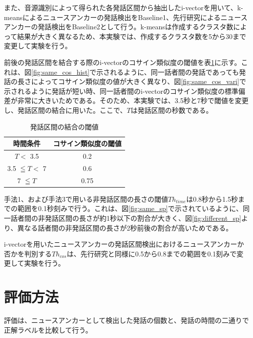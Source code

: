 また、音源識別によって得られた各発話区間から抽出したi-vectorを用いて、k-meansによるニュースアンカーの発話検出をBaseline1、先行研究\cite{nozaki_gakuseikai}によるニュースアンカーの発話検出をBaseline2として行う。k-meansは作成するクラスタ数によって結果が大きく異なるため、本実験では、作成するクラスタ数を5から30まで変更して実験を行う。


前後の発話区間を結合する際のi-vectorのコサイン類似度の閾値を表\ref{table:decide_thcos}に示す。これは、図\ref{fig:same_cos_hist}で示されるように、同一話者間の発話であっても発話の長さによってコサイン類似度の値が大きく異なり、図\ref{fig:same_cos_vari}で示されるように発話が短い時、同一話者間のi-vectorのコサイン類似度の標準偏差が非常に大きいためである。そのため、本実験では、3.5秒と7秒で閾値を変更し、発話区間の結合に用いた。ここで、$T$は発話区間の秒数である。

\begin{table}[H]
  \begin{center}
    \caption{発話区間の結合の閾値 \label{table:decide_thcos}}
    \begin{tabular}{|c||c|} \hline
時間条件 & コサイン類似度の閾値  \\ \hline
$T <$ 3.5 &  0.2 \\ \hline
3.5 $\leqq T <$ 7 &  0.6  \\ \hline
7 $\leqq T$ &  0.75 \\ \hline
    \end{tabular}
  \end{center}
\end{table}

手法1、および手法3で用いる非発話区間の長さの閾値$Th_{time}$は0.8秒から1.5秒までの範囲を0.1秒刻みで行う。これは、図\ref{fig:same_sp}で示されているように、同一話者間の非発話区間の長さが約1秒以下の割合が大きく、図\ref{fig:different_sp}より、異なる話者間の非発話区間の長さが2秒前後の割合が高いためである。\par
i-vectorを用いたニュースアンカーの発話区間検出におけるニュースアンカーか否かを判別する$Th_{cos}$は、先行研究\cite{nozaki_gakuseikai}と同様に0.5から0.8までの範囲を0.1刻みで変更して実験を行う。\par

\section{評価方法}
評価は、ニュースアンカーとして検出した発話の個数と、発話の時間の二通りで正解ラベルを比較して行う。

